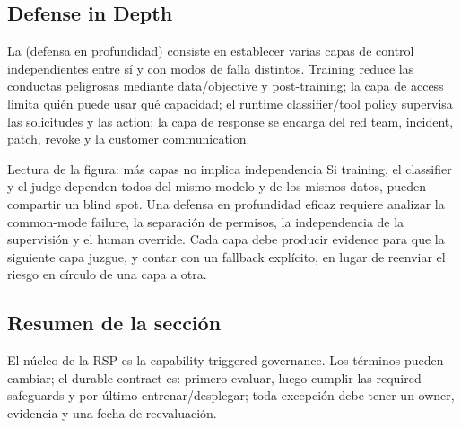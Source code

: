 
\subsection{Defense in Depth}

La  (defensa en profundidad) consiste en establecer varias capas de control independientes entre sí y con modos de falla distintos. Training reduce las conductas peligrosas mediante data/objective y post-training; la capa de access limita quién puede usar qué capacidad; el runtime classifier/tool policy supervisa las solicitudes y las action; la capa de response se encarga del red team, incident, patch, revoke y la customer communication.


\begin{knowledgebox}{Lectura de la figura: más capas no implica independencia}
Si training, el classifier y el judge dependen todos del mismo modelo y de los mismos datos, pueden compartir un blind spot. Una defensa en profundidad eficaz requiere analizar la common-mode failure, la separación de permisos, la independencia de la supervisión y el human override. Cada capa debe producir evidence para que la siguiente capa juzgue, y contar con un fallback explícito, en lugar de reenviar el riesgo en círculo de una capa a otra.
\end{knowledgebox}

\subsection{Resumen de la sección}

El núcleo de la RSP es la capability-triggered governance. Los términos pueden cambiar; el durable contract es: primero evaluar, luego cumplir las required safeguards y por último entrenar/desplegar; toda excepción debe tener un owner, evidencia y una fecha de reevaluación.
